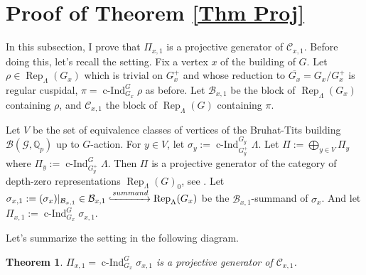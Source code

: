 \documentclass{article}
\newtheorem{theorem}{Theorem}
\DeclareMathOperator{\cInd}{\operatorname{c-Ind}}
\newcommand{\Rep}{\operatorname{Rep}}
\begin{document}
	
	\section{Proof of Theorem \ref{Thm Proj}}
	
	In this subsection, I prove that $\Pi_{x,1}$ is a projective generator of $\mathcal{C}_{x,1}$. Before doing this, let's recall the setting. Fix a vertex $x$ of the building of $G$. Let $\rho \in \Rep_{\Lambda}(G_x)$ which is trivial on $G_x^+$ and whose reduction to $\overline{G_x}=G_x/G_x^+$ is regular cuspidal, $\pi=\cInd_{G_x}^G\rho$ as before. Let $\mathcal{B}_{x,1}$ be the block of $\Rep_{\Lambda}(G_x)$ containing $\rho$, and $\mathcal{C}_{x,1}$ the block of $\Rep_{\Lambda}(G)$ containing $\pi$. 
	
	Let $V$ be the set of equivalence classes of vertices of the Bruhat-Tits building $\mathcal{B}(\mathcal{G}, \mathbb{Q}_p)$ up to $G$-action. For $y \in V$, let $\sigma_y:=\cInd_{G_y^+}^{G_y}\Lambda$. Let $\Pi:=\bigoplus_{y \in V}\Pi_y$ where $\Pi_y:=\cInd_{G_y^+}^G\Lambda$. Then $\Pi$ is a projective generator of the category of depth-zero representations $\Rep_{\Lambda}(G)_0$, see \cite[Appendix]{dat2009finitude}. Let $\sigma_{x,1}:=(\sigma_x)|_{\mathcal{B}_{x,1}} \in \mathcal{B}_{x,1} \xhookrightarrow{summand} \Rep_{\Lambda}(G_x)$ be the $\mathcal{B}_{x,1}$-summand of $\sigma_x$. And let $\Pi_{x,1}:=\cInd_{G_x}^G\sigma_{x,1}$.
	
	Let's summarize the setting in the following diagram.
	
	
	\begin{theorem}
		$\Pi_{x,1}=\cInd_{G_x}^G\sigma_{x,1}$ is a projective generator of $\mathcal{C}_{x,1}$.
	\end{theorem}
	
\end{document}
